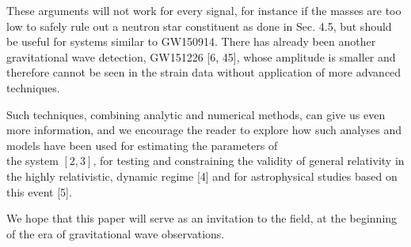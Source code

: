 \documentclass[10pt]{article}
\begin{document}
These arguments will not work for every signal, for instance if the masses are too low to safely rule out a neutron star constituent as done in Sec. 4.5, but should be useful for systems similar to GW150914. There has already been another gravitational wave detection, GW151226 [6, 45], whose amplitude is smaller and therefore cannot be seen in the strain data without application of more advanced techniques.

Such techniques, combining analytic and numerical methods, can give us even more information, and we encourage the reader to explore how such analyses and models have been used for estimating the parameters of\\
the system $[2,3]$, for testing and constraining the validity of general relativity in the highly relativistic, dynamic regime [4] and for astrophysical studies based on this event [5].

We hope that this paper will serve as an invitation to the field, at the beginning of the era of gravitational wave observations.
\end{document}

